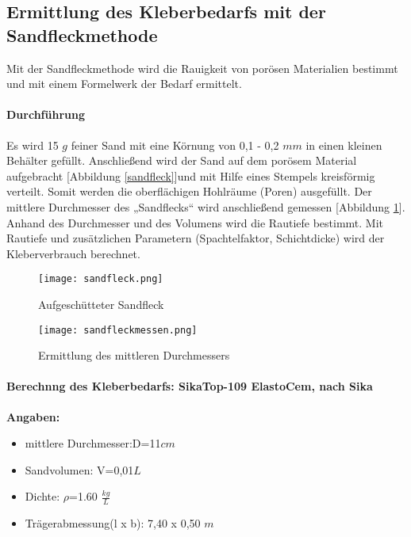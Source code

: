 \documentclass[12 pt,a4 paper ]{scrreprt}
\begin{document}
\subsection{Ermittlung des Kleberbedarfs mit der Sandfleckmethode}

Mit der Sandfleckmethode wird die Rauigkeit von porösen Materialien bestimmt  
und mit einem Formelwerk der Bedarf ermittelt.

\paragraph{Durchführung}
Es wird 15 $g$ feiner Sand mit eine Körnung von 0,1 - 0,2 $mm$ in einen kleinen Behälter gefüllt. Anschließend wird der Sand auf dem porösem Material aufgebracht [Abbildung \ref{sandfleck}]und mit Hilfe eines Stempels kreisförmig verteilt. Somit werden die oberflächigen Hohlräume (Poren) ausgefüllt. Der mittlere Durchmesser des „Sandflecks“ wird anschließend gemessen [Abbildung \ref{sandfleckmessen}]. Anhand des Durchmesser und des Volumens wird die Rautiefe bestimmt. Mit Rautiefe und zusätzlichen Parametern (Spachtelfaktor, Schichtdicke) wird der Kleberverbrauch berechnet.

\begin{figure}[h]
\begin{minipage}[hbt]{7cm}	
	\texttt{[image: sandfleck.png]}
	\caption{Aufgeschütteter Sandfleck}
	\label{sandfleck}
\end{minipage}
\hfill
\begin{minipage}[hbt]{7cm}
	\texttt{[image: sandfleckmessen.png]}
	\caption{Ermittlung des mittleren Durchmessers}
	\label{sandfleckmessen}
\end{minipage}
\end{figure}
\paragraph{Berechnng des Kleberbedarfs: SikaTop-109 ElastoCem, nach Sika}

\textbf{Angaben:}
\begin{center}

\begin{itemize}
\item mittlere Durchmesser:D=11$cm$
\item Sandvolumen:	V=0,01$L$
\item Dichte:	$\rho$=1.60 $\frac{kg}{L}$
\item Trägerabmessung(l x b):	7,40 x 0,50 $m $
\end{itemize}
\end{center}
\end{document}
